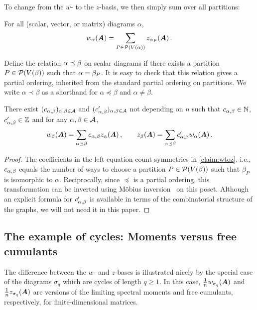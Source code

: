 To change from the $w$- to the $z$-basis, we then simply sum over all partitions:

\begin{claim}
    \label{claim:wtoz}
    For all (scalar, vector, or matrix) diagrams $\alpha$, 
    \[
        w_{\alpha}({\bm A}) = \sum_{P \in {\cal P}(V(\alpha))} z_{\alpha_P}({\bm A})\,.
    \]
\end{claim}

Define the relation $\alpha \preceq \beta$ on scalar diagrams if there exists a partition $P \in {\cal P}(V(\beta))$
such that $\alpha = \beta_P$.
It is easy to check that this relation gives a partial ordering, inherited from the standard partial ordering on partitions.
We write $\alpha\prec \beta$ as a shorthand for
$\alpha\preceq \beta$ and $\alpha\neq \beta$.

\begin{lemma}
    \label{claim:mobius}
    There exist $(c_{\alpha, \beta})_{\alpha, \beta \in {\cal A}}$ and $(c'_{\alpha, \beta})_{\alpha,\beta\in{\cal A}}$ not depending on $n$ such that $c_{\alpha, \beta} \in \mathbb{N}$, $c'_{\alpha,\beta} \in \mathbb{Z}$ and for any $\alpha,\beta\in{\cal A}$, 
    \[
        w_\beta({\bm A}) = \sum_{\alpha \preceq \beta} c_{\alpha, \beta} z_\alpha({\bm A})\,,\qquad 
        z_{\beta}({\bm A}) = \sum_{\alpha \preceq \beta} c'_{\alpha,\beta} w_{\alpha}({\bm A})\,.
    \]
\end{lemma}
\begin{proof}
    The coefficients in the left equation count symmetries in \cref{claim:wtoz}, i.e.,
    $c_{\alpha,\beta}$ equals the number of ways to choose a partition $P \in {\cal P}(V(\beta))$
    such that $\beta_P$ is isomorphic to $\alpha$.
    Reciprocally, since $\preceq$ is a partial ordering, this
    transformation can be inverted using M{\"obius} inversion~\cite{Rota-1964-Foundations} on this poset.
    Although an explicit formula for $c'_{\alpha, \beta}$
    is available in terms of the
    combinatorial structure of the graphs, we will not need it in this paper.
\end{proof}


\subsection{The example of cycles: Moments versus free cumulants}
\label{sec:moments-free-cumulants}

The difference
between the $w$- and $z$-bases is illustrated nicely by the
special case of the diagrams $\sigma_q$ which are cycles of length $q\ge 1$.
In this case, $\frac 1n w_{\sigma_q}({\bm A})$ and $\frac 1n z_{\sigma_q}({\bm A})$ are versions of the limiting spectral moments and free cumulants, respectively, for finite-dimensional matrices.


